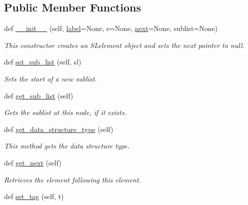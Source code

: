 \subsection*{Public Member Functions}
\begin{DoxyCompactItemize}
\item 
def \mbox{\hyperlink{classbridges_1_1ml__element_1_1_m_lelement_a079043b0d070583b38881b663fb2e595}{\+\_\+\+\_\+init\+\_\+\+\_\+}} (self, \mbox{\hyperlink{classbridges_1_1element_1_1_element_a97551dbb005cd5d1f13b65461290c6e3}{label}}=None, e=None, \mbox{\hyperlink{classbridges_1_1sl__element_1_1_s_lelement_a4fa8e9321dd2ce726da047ddc64adabf}{next}}=None, sublist=None)
\begin{DoxyCompactList}\small\item\em This constructor creates an S\+Lelement object and sets the next pointer to null. \end{DoxyCompactList}\item 
def \mbox{\hyperlink{classbridges_1_1ml__element_1_1_m_lelement_a578cd6c05bb6f38939bd41d0e1c93613}{set\+\_\+sub\+\_\+list}} (self, sl)
\begin{DoxyCompactList}\small\item\em Sets the start of a new sublist. \end{DoxyCompactList}\item 
def \mbox{\hyperlink{classbridges_1_1ml__element_1_1_m_lelement_a9a11300019a637de7b3f4a756998ac32}{get\+\_\+sub\+\_\+list}} (self)
\begin{DoxyCompactList}\small\item\em Gets the sublist at this node, if it exists. \end{DoxyCompactList}\item 
def \mbox{\hyperlink{classbridges_1_1ml__element_1_1_m_lelement_a97693d616263a8ee59b066829e8ce7e8}{get\+\_\+data\+\_\+structure\+\_\+type}} (self)
\begin{DoxyCompactList}\small\item\em This method gets the data structure type. \end{DoxyCompactList}\item 
def \mbox{\hyperlink{classbridges_1_1ml__element_1_1_m_lelement_aca0cc01e2041a3d283a3e1ceca3050da}{get\+\_\+next}} (self)
\begin{DoxyCompactList}\small\item\em Retrieves the element following this element. \end{DoxyCompactList}\item 
def \mbox{\hyperlink{classbridges_1_1ml__element_1_1_m_lelement_af556c1716954cfa671e1a79dff78f66a}{set\+\_\+tag}} (self, t)

\end{DoxyCompactItemize}
